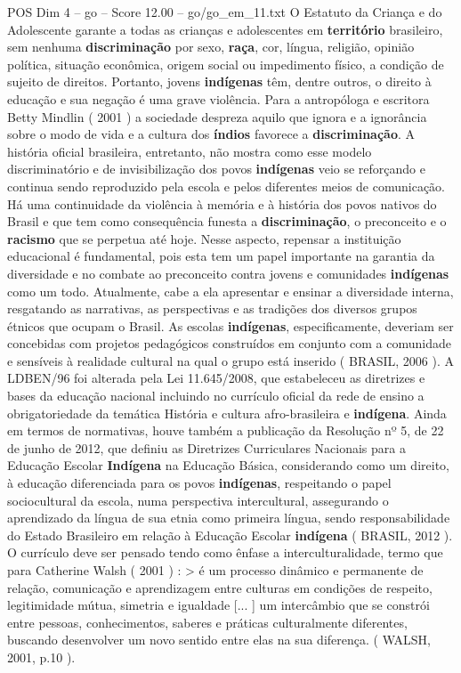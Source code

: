 \begin{textsample}{POS Dim 4 – go – Score 12.00 – go/go\_em\_11.txt}
O Estatuto da Criança e do Adolescente garante a todas as crianças e adolescentes em \textbf{território} brasileiro, sem nenhuma \textbf{discriminação} por sexo, \textbf{raça}, cor, língua, religião, opinião política, situação econômica, origem social ou impedimento físico, a condição de sujeito de direitos.
Portanto, jovens \textbf{indígenas} têm, dentre outros, o direito à educação e sua negação é uma grave violência.
Para a antropóloga e escritora Betty Mindlin ( 2001 ) a sociedade despreza aquilo que ignora e a ignorância sobre o modo de vida e a cultura dos \textbf{índios} favorece a \textbf{discriminação}.
A história oficial brasileira, entretanto, não mostra como esse modelo discriminatório e de invisibilização dos povos \textbf{indígenas} veio se reforçando e continua sendo reproduzido pela escola e pelos diferentes meios de comunicação.
Há uma continuidade da violência à memória e à história dos povos nativos do Brasil e que tem como consequência funesta a \textbf{discriminação}, o preconceito e o \textbf{racismo} que se perpetua até hoje.
Nesse aspecto, repensar a instituição educacional é fundamental, pois esta tem um papel importante na garantia da diversidade e no combate ao preconceito contra jovens e comunidades \textbf{indígenas} como um todo.
Atualmente, cabe a ela apresentar e ensinar a diversidade interna, resgatando as narrativas, as perspectivas e as tradições dos diversos grupos étnicos que ocupam o Brasil.
As escolas \textbf{indígenas}, especificamente, deveriam ser concebidas com projetos pedagógicos construídos em conjunto com a comunidade e sensíveis à realidade cultural na qual o grupo está inserido ( BRASIL, 2006 ).
A LDBEN/96 foi alterada pela Lei 11.645/2008, que estabeleceu as diretrizes e bases da educação nacional incluindo no currículo oficial da rede de ensino a obrigatoriedade da temática História e cultura afro-brasileira e \textbf{indígena}.
Ainda em termos de normativas, houve também a publicação da Resolução nº 5, de 22 de junho de 2012, que definiu as Diretrizes Curriculares Nacionais para a Educação Escolar \textbf{Indígena} na Educação Básica, considerando como um direito, à educação diferenciada para os povos \textbf{indígenas}, respeitando o papel sociocultural da escola, numa perspectiva intercultural, assegurando o aprendizado da língua de sua etnia como primeira língua, sendo responsabilidade do Estado Brasileiro em relação à Educação Escolar \textbf{indígena} ( BRASIL, 2012 ).
O currículo deve ser pensado tendo como ênfase a interculturalidade, termo que para Catherine Walsh ( 2001 ) : > é um processo dinâmico e permanente de relação, comunicação e aprendizagem entre culturas em condições de respeito, legitimidade mútua, simetria e igualdade [... ] um intercâmbio que se constrói entre pessoas, conhecimentos, saberes e práticas culturalmente diferentes, buscando desenvolver um novo sentido entre elas na sua diferença. ( WALSH, 2001, p.10 ).

\end{textsample}
